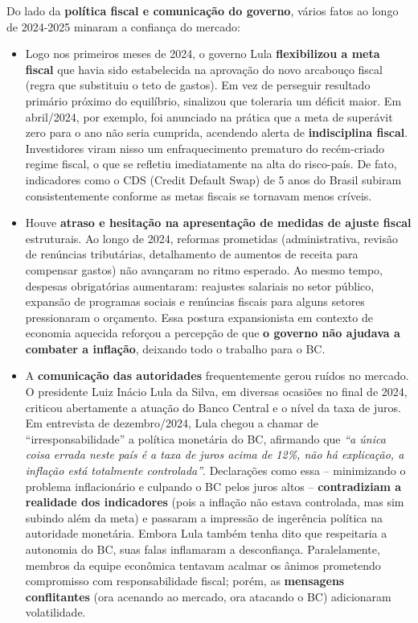 \documentclass[a4paper,12pt]{article}
\begin{document}
Do lado da \textbf{política fiscal e comunicação do governo}, vários fatos ao longo de 2024-2025 minaram a confiança do mercado:
\begin{itemize}
    \item Logo nos primeiros meses de 2024, o governo Lula \textbf{flexibilizou a meta fiscal} que havia sido estabelecida na aprovação do novo arcabouço fiscal (regra que substituiu o teto de gastos). Em vez de perseguir resultado primário próximo do equilíbrio, sinalizou que toleraria um déficit maior. Em abril/2024, por exemplo, foi anunciado na prática que a meta de superávit zero para o ano não seria cumprida, acendendo alerta de \textbf{indisciplina fiscal}. Investidores viram nisso um enfraquecimento prematuro do recém-criado regime fiscal, o que se refletiu imediatamente na alta do risco-país. De fato, indicadores como o CDS (Credit Default Swap) de 5 anos do Brasil subiram consistentemente conforme as metas fiscais se tornavam menos críveis.
    \item Houve \textbf{atraso e hesitação na apresentação de medidas de ajuste fiscal} estruturais. Ao longo de 2024, reformas prometidas (administrativa, revisão de renúncias tributárias, detalhamento de aumentos de receita para compensar gastos) não avançaram no ritmo esperado. Ao mesmo tempo, despesas obrigatórias aumentaram: reajustes salariais no setor público, expansão de programas sociais e renúncias fiscais para alguns setores pressionaram o orçamento. Essa postura expansionista em contexto de economia aquecida reforçou a percepção de que \textbf{o governo não ajudava a combater a inflação}, deixando todo o trabalho para o BC.
    \item A \textbf{comunicação das autoridades} frequentemente gerou ruídos no mercado. O presidente Luiz Inácio Lula da Silva, em diversas ocasiões no final de 2024, criticou abertamente a atuação do Banco Central e o nível da taxa de juros. Em entrevista de dezembro/2024, Lula chegou a chamar de ``irresponsabilidade'' a política monetária do BC, afirmando que \emph{``a única coisa errada neste país é a taxa de juros acima de 12\%, não há explicação, a inflação está totalmente controlada''}. Declarações como essa -- minimizando o problema inflacionário e culpando o BC pelos juros altos -- \textbf{contradiziam a realidade dos indicadores} (pois a inflação não estava controlada, mas sim subindo além da meta) e passaram a impressão de ingerência política na autoridade monetária. Embora Lula também tenha dito que respeitaria a autonomia do BC, suas falas inflamaram a desconfiança. Paralelamente, membros da equipe econômica tentavam acalmar os ânimos prometendo compromisso com responsabilidade fiscal; porém, as \textbf{mensagens conflitantes} (ora acenando ao mercado, ora atacando o BC) adicionaram volatilidade.

\end{itemize}
\end{document}
